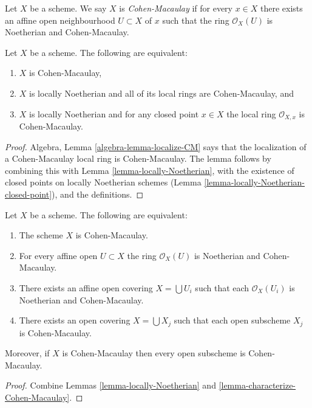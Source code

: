 \begin{definition}
\label{definition-Cohen-Macaulay}
Let $X$ be a scheme. We say $X$ is {\it Cohen-Macaulay} if
for every $x \in X$ there exists an affine open neighbourhood
$U \subset X$ of $x$ such that the ring $\mathcal{O}_X(U)$ is
Noetherian and Cohen-Macaulay.
\end{definition}

\begin{lemma}
\label{lemma-characterize-Cohen-Macaulay}
Let $X$ be a scheme. The following are equivalent:
\begin{enumerate}
\item $X$ is Cohen-Macaulay,
\item $X$ is locally Noetherian and all of its local rings are Cohen-Macaulay,
and
\item $X$ is locally Noetherian and for any closed point $x \in X$
the local ring $\mathcal{O}_{X, x}$ is Cohen-Macaulay.
\end{enumerate}
\end{lemma}

\begin{proof}
Algebra, Lemma \ref{algebra-lemma-localize-CM} says that the localization of
a Cohen-Macaulay local ring is Cohen-Macaulay. The lemma follows
by combining this with Lemma \ref{lemma-locally-Noetherian},
with the existence of closed
points on locally Noetherian schemes
(Lemma \ref{lemma-locally-Noetherian-closed-point}), and
the definitions.
\end{proof}

\begin{lemma}
\label{lemma-locally-Cohen-Macaulay}
Let $X$ be a scheme. The following are equivalent:
\begin{enumerate}
\item The scheme $X$ is Cohen-Macaulay.
\item For every affine open $U \subset X$ the ring $\mathcal{O}_X(U)$
is Noetherian and Cohen-Macaulay.
\item There exists an affine open covering $X = \bigcup U_i$ such that
each $\mathcal{O}_X(U_i)$ is Noetherian and Cohen-Macaulay.
\item There exists an open covering $X = \bigcup X_j$
such that each open subscheme $X_j$ is Cohen-Macaulay.
\end{enumerate}
Moreover, if $X$ is Cohen-Macaulay then every open subscheme
is Cohen-Macaulay.
\end{lemma}

\begin{proof}
Combine Lemmas \ref{lemma-locally-Noetherian}
and \ref{lemma-characterize-Cohen-Macaulay}.
\end{proof}

